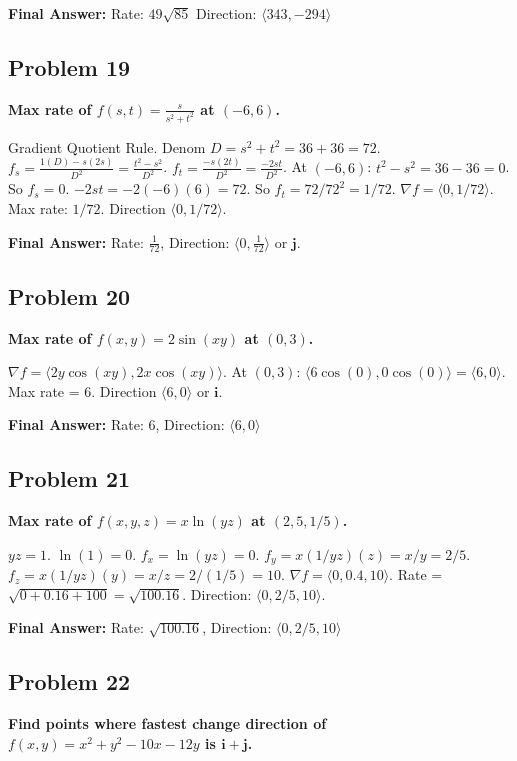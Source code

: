 \documentclass{article}
\begin{document}
\textbf{Final Answer:}
Rate: $\boxed{49\sqrt{85}}$
Direction: $\boxed{\langle 343, -294 \rangle}$

\hrulefill

\subsection*{Problem 19}
\textbf{Max rate of $f(s, t) = \frac{s}{s^2+t^2}$ at $(-6, 6)$.}

Gradient Quotient Rule. Denom $D = s^2+t^2 = 36+36=72$.
$f_s = \frac{1(D) - s(2s)}{D^2} = \frac{t^2-s^2}{D^2}$.
$f_t = \frac{-s(2t)}{D^2} = \frac{-2st}{D^2}$.
At $(-6, 6)$:
$t^2 - s^2 = 36 - 36 = 0$. So $f_s = 0$.
$-2st = -2(-6)(6) = 72$. So $f_t = 72 / 72^2 = 1/72$.
$\nabla f = \langle 0, 1/72 \rangle$.
Max rate: $1/72$. Direction $\langle 0, 1/72 \rangle$.

\textbf{Final Answer:}
Rate: $\boxed{\frac{1}{72}}$, Direction: $\boxed{\langle 0, \frac{1}{72} \rangle}$ or $\mathbf{j}$.

\hrulefill

\subsection*{Problem 20}
\textbf{Max rate of $f(x, y) = 2\sin(xy)$ at $(0, 3)$.}

$\nabla f = \langle 2y \cos(xy), 2x \cos(xy) \rangle$.
At $(0, 3)$: $\langle 6 \cos(0), 0 \cos(0) \rangle = \langle 6, 0 \rangle$.
Max rate = 6. Direction $\langle 6, 0 \rangle$ or $\mathbf{i}$.

\textbf{Final Answer:}
Rate: $\boxed{6}$, Direction: $\boxed{\langle 6, 0 \rangle}$

\hrulefill

\subsection*{Problem 21}
\textbf{Max rate of $f(x, y, z) = x \ln(yz)$ at $(2, 5, 1/5)$.}

$yz = 1$. $\ln(1)=0$.
$f_x = \ln(yz) = 0$.
$f_y = x(1/yz)(z) = x/y = 2/5$.
$f_z = x(1/yz)(y) = x/z = 2/(1/5) = 10$.
$\nabla f = \langle 0, 0.4, 10 \rangle$.
Rate = $\sqrt{0 + 0.16 + 100} = \sqrt{100.16}$.
Direction: $\langle 0, 2/5, 10 \rangle$.

\textbf{Final Answer:}
Rate: $\boxed{\sqrt{100.16}}$, Direction: $\boxed{\langle 0, 2/5, 10 \rangle}$

\hrulefill

\subsection*{Problem 22}
\textbf{Find points where fastest change direction of $f(x, y) = x^2 + y^2 - 10x - 12y$ is $\mathbf{i} + \mathbf{j}$.}
\end{document}
